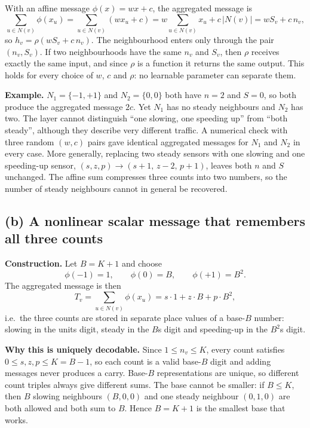 \documentclass[11pt, a4paper]{article}
\begin{document}
With an affine message $\phi(x) = wx + c$, the aggregated message is
\[
\sum_{u \in N(v)} \phi(x_u) = \sum_{u \in N(v)} (w x_u + c) = w \sum_{u \in N(v)} x_u + c\,|N(v)| = w S_v + c\, n_v,
\]
so $h_v = \rho(w S_v + c\, n_v)$. The neighbourhood enters only through the pair $(n_v, S_v)$. If two neighbourhoods have the same $n_v$ and $S_v$, then $\rho$ receives exactly the same input, and since $\rho$ is a function it returns the same output. This holds for every choice of $w$, $c$ and $\rho$: no learnable parameter can separate them.

\textbf{Example.} $N_1 = \{-1, +1\}$ and $N_2 = \{0, 0\}$ both have $n = 2$ and $S = 0$, so both produce the aggregated message $2c$. Yet $N_1$ has no steady neighbours and $N_2$ has two. The layer cannot distinguish ``one slowing, one speeding up'' from ``both steady'', although they describe very different traffic. A numerical check with three random $(w, c)$ pairs gave identical aggregated messages for $N_1$ and $N_2$ in every case. More generally, replacing two steady sensors with one slowing and one speeding-up sensor, $(s, z, p) \to (s+1,\, z-2,\, p+1)$, leaves both $n$ and $S$ unchanged. The affine sum compresses three counts into two numbers, so the number of steady neighbours cannot in general be recovered.

\subsection*{(b) A nonlinear scalar message that remembers all three counts}

\textbf{Construction.} Let $B = K + 1$ and choose
\[
\phi(-1) = 1, \qquad \phi(0) = B, \qquad \phi(+1) = B^2 .
\]
The aggregated message is then
\[
T_v = \sum_{u \in N(v)} \phi(x_u) = s \cdot 1 + z \cdot B + p \cdot B^2 ,
\]
i.e.\ the three counts are stored in separate place values of a base-$B$ number: slowing in the units digit, steady in the $B$s digit and speeding-up in the $B^2$s digit.

\textbf{Why this is uniquely decodable.} Since $1 \le n_v \le K$, every count satisfies $0 \le s, z, p \le K = B - 1$, so each count is a valid base-$B$ digit and adding messages never produces a carry. Base-$B$ representations are unique, so different count triples always give different sums. The base cannot be smaller: if $B \le K$, then $B$ slowing neighbours $(B, 0, 0)$ and one steady neighbour $(0, 1, 0)$ are both allowed and both sum to $B$. Hence $B = K + 1$ is the smallest base that works.
\end{document}
